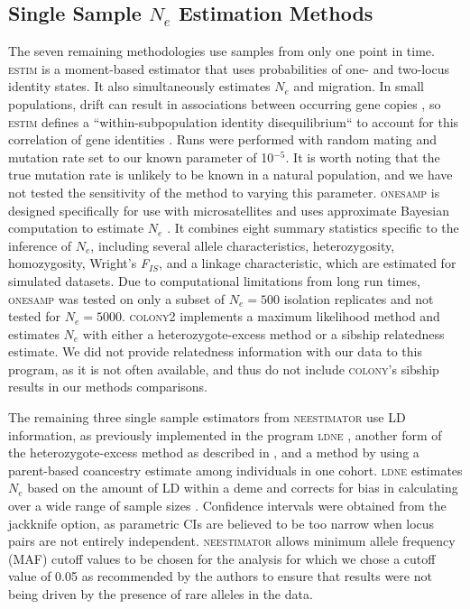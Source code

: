 \subsection{Single Sample $N_e$ Estimation Methods}
The seven remaining methodologies use samples from only one point in time. \textsc{estim} \citep{Vitalis:2001c} 
is a moment-based estimator that uses probabilities of one- and two-locus identity states. 
It also simultaneously estimates $N_e$ and migration. In small populations, drift 
can result in associations between occurring gene copies \citep{Hill:1968}, so \textsc{estim} 
defines a ``within-subpopulation identity disequilibrium`` to account for this correlation of 
gene identities \citep{Vitalis:2001a}. Runs were performed with random mating and 
mutation rate set to our known parameter of 10$^{-5}$. It is worth noting that the true mutation 
rate is unlikely to be known in a natural population, and we have not tested the sensitivity 
of the method to varying this parameter. \textsc{onesamp} is designed specifically for use 
with microsatellites and uses approximate Bayesian computation to estimate $N_e$ 
\citep{Tallmon:2008, Beaumont:2009}. It combines eight summary statistics specific 
to the inference of $N_e$, including several allele characteristics, heterozygosity, 
homozygosity, Wright's \emph{F}$_{IS}$, and a linkage characteristic, which are estimated for simulated 
datasets. Due to computational limitations from long run times, \textsc{onesamp} was tested 
on only a subset of $N_e = 500$ isolation replicates and not tested for $N_e = 500$0. 
\textsc{colony2} \citep{Wang:2009} implements a maximum likelihood method and estimates $N_e$ 
with either a heterozygote-excess method or a sibship relatedness estimate. We did not provide 
relatedness information with our data to this program, as it is not often available, and thus 
do not include \textsc{colony}'s sibship results in our methods comparisons.

The remaining three single sample estimators from \textsc{neestimator} use LD information, as previously 
implemented in the program \textsc{ldne} \citep{Waples:2008}, another form of the heterozygote-excess 
method as described in \citet{Pudovkin:1996}, and a method by \citet{Nomura:2008} using a parent-based coancestry 
estimate among individuals in one cohort. \textsc{ldne} estimates $N_e$ based on the 
amount of LD within a deme \citep{Hill:1981} and corrects for bias in calculating over a wide range of 
sample sizes \citep{Waples:2008}. Confidence intervals were obtained from the jackknife option, 
as parametric CIs are believed to be too narrow when locus pairs are not entirely independent. 
\textsc{neestimator} allows minimum allele frequency (MAF) cutoff values to be chosen for the analysis 
for which we chose a cutoff value of 0.05 as recommended by the authors to ensure that results were 
not being driven by the presence of rare alleles in the data.

